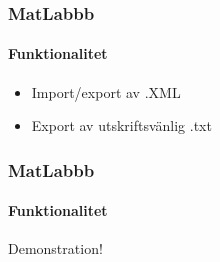 \begin{frame}
  \frametitle{MatLabbb}
  \framesubtitle{Funktionalitet}
  \begin{itemize}
  \item<1-> Import/export av .XML
  \item<2-> Export av utskriftsvänlig  .txt
  \end{itemize}
\end{frame}

\begin{frame}[c]
  \frametitle{MatLabbb}
  \framesubtitle{Funktionalitet}
  \centering
  \Huge{Demonstration!}
\end{frame}

